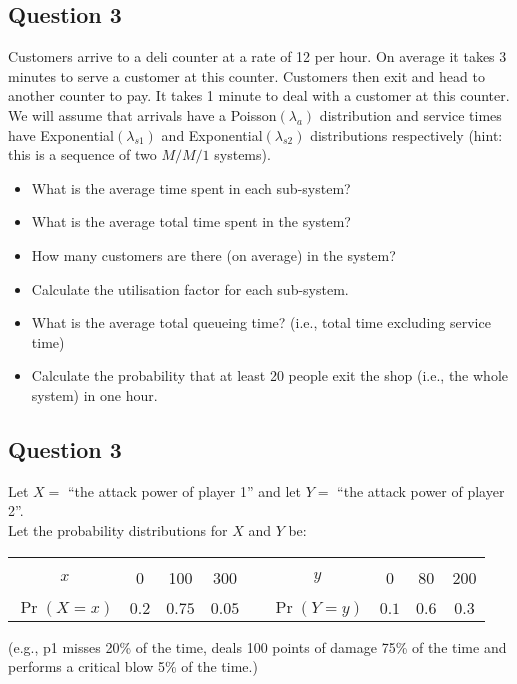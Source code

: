 \documentclass[]{report}
\begin{document}

\subsection*{Question 3}
Customers arrive to a deli counter at a rate of 12 per hour. On average it takes 3 minutes to serve a customer at this counter. 
Customers then exit and head to another counter to pay. It takes 1 minute to deal with a customer at this counter. We will assume that arrivals have a Poisson$(\lambda_a)$ distribution and service times have Exponential$(\lambda_{s1})$ and Exponential$(\lambda_{s2})$ distributions respectively (hint: this is a sequence of two $M/M/1$ systems).\\[-0.2cm]

\begin{itemize}
\item[(a)] What is the average time spent in each sub-system?  
\item[(b)] What is the average total time spent in the system?  
\item[(c)] How many customers are there (on average) in the system?   
\item[(d)] Calculate the utilisation factor for each sub-system.  
\item[(e)] What is the average total queueing time? (i.e., total time excluding service time)  
\item[(f)] Calculate the probability that at least 20 people exit the shop (i.e., the whole system) in one hour.
\end{itemize}
\subsection*{Question 3}
Let $X =$ ``the attack power of player 1'' and let $Y =$ ``the attack power of player 2''.\\[-0.3cm]

Let the probability distributions for $X$ and $Y$ be:
\begin{center}
\begin{tabular}{|c|ccc|c|c|ccc|}
\cline{1-4}\cline{6-9}
&&&&&&&&\\[-0.4cm]
$x$ & 0 & 100 & 300 & \qquad\qquad & $y$ & 0 & 80 & 200\\
\cline{1-4}\cline{6-9}
&&&&&&&&\\[-0.4cm]
$\Pr(X=x)$ & $0.2$ & $0.75$ & $0.05$ & & $\Pr(Y=y)$ & $0.1$ & $0.6$ & $0.3$ \\[0.1cm]
\cline{1-4}\cline{6-9}
\end{tabular}
\end{center}
{\footnotesize(e.g., p1 misses 20\% of the time, deals 100 points of damage 75\% of the time and performs a critical blow 5\% of the time.)}\\[-0.2cm]
\end{document}
